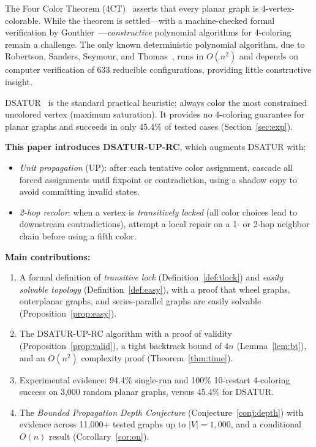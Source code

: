 \documentclass[11pt,twocolumn]{article}
\begin{document}
The Four Color Theorem (4CT)~\cite{appelhaken1977a,appelhaken1977b}
asserts that every planar graph is 4-vertex-colorable.  While the theorem
is settled---with a machine-checked formal verification by
Gonthier~\cite{gonthier2008}---\emph{constructive} polynomial algorithms
for 4-coloring remain a challenge.  The only known deterministic polynomial
algorithm, due to Robertson, Sanders, Seymour, and
Thomas~\cite{robertson1997}, runs in $O(n^2)$ and depends on computer
verification of 633 reducible configurations, providing little constructive
insight.

DSATUR~\cite{brelaz1979} is the standard practical heuristic: always
color the most constrained uncolored vertex (maximum saturation).  It
provides no 4-coloring guarantee for planar graphs and succeeds in only
45.4\% of tested cases (Section~\ref{sec:exp}).

\textbf{This paper introduces DSATUR-UP-RC}, which augments DSATUR with:
\begin{itemize}[noitemsep]
  \item \emph{Unit propagation} (UP): after each tentative color
        assignment, cascade all forced assignments until fixpoint or
        contradiction, using a shadow copy to avoid committing invalid
        states.
  \item \emph{2-hop recolor}: when a vertex is \emph{transitively locked}
        (all color choices lead to downstream contradictions), attempt a
        local repair on a 1- or 2-hop neighbor chain before using a fifth
        color.
\end{itemize}

\textbf{Main contributions:}
\begin{enumerate}[noitemsep]
  \item A formal definition of \emph{transitive lock}
        (Definition~\ref{def:tlock}) and \emph{easily solvable topology}
        (Definition~\ref{def:easy}), with a proof that wheel graphs,
        outerplanar graphs, and series-parallel graphs are easily solvable
        (Proposition~\ref{prop:easy}).
  \item The DSATUR-UP-RC algorithm with a proof of validity
        (Proposition~\ref{prop:valid}), a tight backtrack bound of $4n$
        (Lemma~\ref{lem:bt}), and an $O(n^2)$ complexity proof
        (Theorem~\ref{thm:time}).
  \item Experimental evidence: 94.4\% single-run and 100\% 10-restart
        4-coloring success on 3{,}000 random planar graphs, versus 45.4\%
        for DSATUR.
  \item The \emph{Bounded Propagation Depth Conjecture}
        (Conjecture~\ref{conj:depth}) with evidence across 11{,}000+
        tested graphs up to $|V|=1{,}000$, and a conditional $O(n)$
        result (Corollary~\ref{cor:on}).
\end{enumerate}
\end{document}
